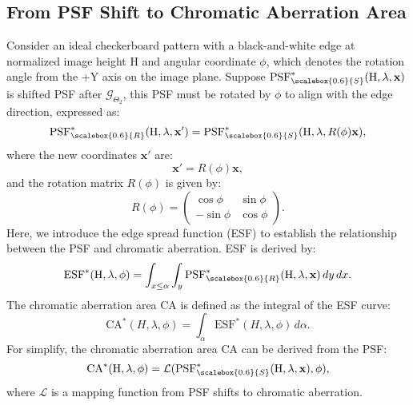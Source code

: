 \subsection{From PSF Shift to Chromatic Aberration Area}

Consider an ideal checkerboard pattern with a black-and-white edge at normalized image height $\mathrm{H}$ and angular coordinate \(\phi\), which denotes the rotation angle from the +Y axis on the image plane. Suppose $\text{PSF}_{\scalebox{0.6}{S}}^*(\mathrm{H}, \lambda, \mathbf{x})$ is shifted PSF after $\mathcal{G}_{\Theta_2}$,  this PSF must be rotated by \(\phi\) to align with the edge direction, expressed as:
\begin{equation}\label{eq:rotatepsf}
\text{PSF}_{\scalebox{0.6}{R}}^*(\mathrm{H}, \lambda, \mathbf{x}') = \text{PSF}_{\scalebox{0.6}{S}}^*(\mathrm{H}, \lambda, R(\phi) \mathbf{x}),
\end{equation}
where the new coordinates $\mathbf{x}'$ are:
\begin{equation}\label{eq:newaxis}
\mathbf{x}' = R(\phi) \mathbf{x},
\end{equation}
and the rotation matrix \(R(\phi)\) is given by:
\begin{equation}\label{eq:rotate}
R(\phi) = 
\begin{pmatrix}
\cos\phi & \sin\phi \\
-\sin\phi & \cos\phi
\end{pmatrix}.
\end{equation}
Here, we introduce the edge spread function (ESF)  to establish the relationship between the PSF and chromatic aberration. ESF is derived by:
\begin{equation}\label{eq:sup_esf}
\text{ESF}^*(\mathrm{H}, \lambda, \phi) = \int_{x \leq \alpha} \int_{y} \text{PSF}_{\scalebox{0.6}{R}}^*(\mathrm{H}, \lambda, \mathbf{x}) \, dy \, dx.
\end{equation}
The chromatic aberration area CA is defined as the integral of the ESF curve:
\begin{equation}\label{eq:sup_ca}
\text{CA}^*(H, \lambda, \phi) = \int_{\alpha} \text{ESF}^*(H, \lambda, \phi) \, d\alpha.
\end{equation}
For simplify,  the chromatic aberration area CA can be derived from the PSF:
\begin{equation}\label{eq:sup_ca_L}
\text{CA}^*(\mathrm{H}, \lambda, \phi)= \mathcal{L}(\text{PSF}_{\scalebox{0.6}{S}}^*(\mathrm{H}, \lambda, \mathbf{x}), \phi),
\end{equation}
where $\mathcal{L}$ is a mapping function from PSF shifts to chromatic aberration.




